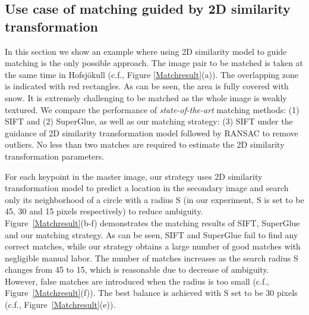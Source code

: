 \subsection{Use case of matching guided by 2D similarity transformation}
\label{inputHomography}
In this section we show an example where using 2D similarity model to guide matching is the only possible approach. 
The image pair to be matched is taken at the same time in Hofsjökull (c.f., Figure \ref{Matchresult}(a)). The overlapping zone is indicated with red rectangles. As can be seen, the area is fully covered with snow. It is extremely challenging to be matched as the whole image is weakly textured.  
We compare the performance of \textit{state-of-the-art} matching methods: (1) SIFT and (2) SuperGlue, as well as our matching strategy: (3) SIFT under the guidance of 2D similarity transformation model followed by RANSAC to remove outliers. 
No less than two matches are required to estimate the 2D similarity transformation parameters. 
\par
For each keypoint in the master image, our strategy uses 2D similarity transformation model to predict a location in the secondary image and search only its neighborhood of a circle with a radius S (in our experiment, S is set to be 45, 30 and 15 pixels respectively) to reduce ambiguity.\\
Figure~\ref{Matchresult}(b-f) demonstrates the matching results of SIFT, SuperGlue and our matching strategy. As can be seen, SIFT and SuperGlue fail to find any correct matches, while our strategy obtains a large number of good matches with negligible manual labor. The number of matches increases as the search radius S changes from 45 to 15, which is reasonable due to decrease of ambiguity. However, false matches are introduced when the radius is too small (c.f., Figure~\ref{Matchresult}(f)). The best balance is achieved with S set to be 30 pixels (c.f., Figure~\ref{Matchresult}(e)).\\
